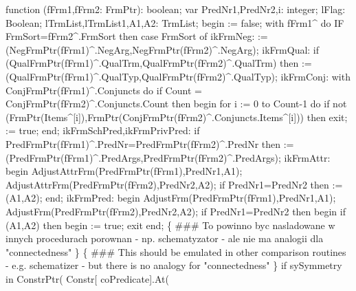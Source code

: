 function (fFrm1,fFrm2: FrmPtr): boolean;
var
   PredNr1,PredNr2,i: integer;
   lFlag: Boolean;
   lTrmList,lTrmList1,A1,A2: TrmList;
begin
    := false;
   with fFrm1^ do IF FrmSort=fFrm2^.FrmSort then
      case FrmSort of
         ikFrmNeg:
             := (NegFrmPtr(fFrm1)^.NegArg,NegFrmPtr(fFrm2)^.NegArg);
         ikFrmQual:
            if (QualFrmPtr(fFrm1)^.QualTrm,QualFrmPtr(fFrm2)^.QualTrm) then
                := (QualFrmPtr(fFrm1)^.QualTyp,QualFrmPtr(fFrm2)^.QualTyp);
         ikFrmConj:
            with ConjFrmPtr(fFrm1)^.Conjuncts do
            if Count = ConjFrmPtr(fFrm2)^.Conjuncts.Count then
            begin
               for i := 0 to Count-1 do
                  if not (FrmPtr(Items^[i]),FrmPtr(ConjFrmPtr(fFrm2)^.Conjuncts.Items^[i])) then
                     exit;
                := true;
            end;
         ikFrmSchPred,ikFrmPrivPred:
            if PredFrmPtr(fFrm1)^.PredNr=PredFrmPtr(fFrm2)^.PredNr then
                := (PredFrmPtr(fFrm1)^.PredArgs,PredFrmPtr(fFrm2)^.PredArgs);
         ikFrmAttr:
            begin
               AdjustAttrFrm(PredFrmPtr(fFrm1),PredNr1,A1);
               AdjustAttrFrm(PredFrmPtr(fFrm2),PredNr2,A2);
               if PredNr1=PredNr2 then
                   := (A1,A2);
            end;
         ikFrmPred:
            begin
               AdjustFrm(PredFrmPtr(fFrm1),PredNr1,A1);
               AdjustFrm(PredFrmPtr(fFrm2),PredNr2,A2);
               if PredNr1=PredNr2 then
               begin
                  if (A1,A2) then
                  begin  := true;
                  exit
                  end;
                  \{ ### To powinno byc nasladowane w innych procedurach porownan
                    - np. schematyzator - ale nie ma analogii dla "connectedness"
                  \}
                  \{ ### This should be emulated in other comparison routines
                    - e.g. schematizer - but there is no analogy for "connectedness"
                  \}
                  if sySymmetry in ConstrPtr( Constr[ coPredicate].At(
